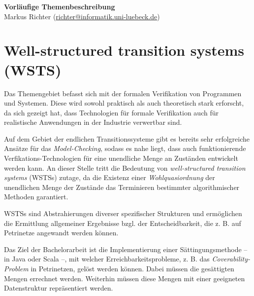 \documentclass[
  a4paper,               %
  twoside,               %
  headings=small,        %
  DIV=12,                %
  BCOR=1cm,              %
  headinclude=true,      %
  footinclude=true,      %
  numbers=noenddot,      %
  11pt]{scrartcl}        %
\begin{document}
\begin{center}
\textbf{\huge Vorläufige Themenbeschreibung} \\[1em]
Markus Richter (\url{richter@informatik.uni-luebeck.de})
\end{center}


\section*{Well-structured transition systems (WSTS)}
Das Themengebiet befasst sich mit der formalen Verifikation von Programmen und Systemen. Diese wird sowohl praktisch als auch theoretisch stark erforscht, da sich gezeigt hat, dass Technologien für formale Verifikation auch für realistische Anwendungen in der Industrie verwertbar sind. 

Auf dem Gebiet der endlichen Transitionssysteme gibt es bereits sehr erfolgreiche Ansätze für das \emph{Model-Checking}, sodass es nahe liegt, dass auch funktionierende Verfikations-Technologien für eine unendliche Menge an Zuständen entwickelt werden kann. An dieser Stelle tritt die Bedeutung von \emph{well-structured transition systems} (WSTSs) zutage, da die Existenz einer \emph{Wohlquasiordnung} der unendlichen Menge der Zustände das Terminieren bestimmter algorithmischer Methoden garantiert. 

WSTSs sind Abstrahierungen diverser spezifischer Strukturen und ermöglichen die Ermittlung allgemeiner Ergebnisse bzgl. der Entscheidbarkeit, die z. B. auf Petrinetze angewandt werden können. 

Das Ziel der Bachelorarbeit ist die Implementierung einer Sättingungsmethode -- in Java oder Scala --, mit welcher Erreichbarkeitsprobleme, z. B. das \emph{Coverability-Problem} in Petrinetzen, gelöst werden können. Dabei müssen die gesättigten Mengen errechnet werden. Weiterhin müssen diese Mengen mit einer geeigneten Datenstruktur repräsentiert werden. 
\end{document}
